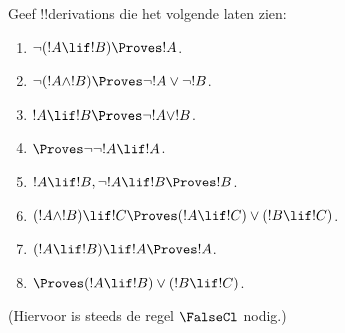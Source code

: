 \documentclass[../../../include/open-logic-section]{subfiles}
\begin{document}
\begin{prob}
Geef !!{derivation}s die het volgende laten zien:
\begin{enumerate}
\item $\lnot(!A \lif !B) \Proves !A$.
\item $\lnot(!A \land !B) \Proves \lnot !A \lor \lnot !B$.
\item $!A \lif !B \Proves \lnot !A \lor !B$.
\item $\Proves \lnot \lnot !A \lif !A$.
\item $!A \lif !B, \lnot !A \lif !B \Proves !B$.
\item $(!A \land !B) \lif !C \Proves (!A \lif !C) \lor (!B \lif !C)$.
\item $(!A \lif !B) \lif !A \Proves !A$.
\item $\Proves (!A \lif !B) \lor (!B \lif !C)$.
\end{enumerate}
(Hiervoor is steeds de regel $\FalseCl$ nodig.)
\end{prob}
\end{document}
